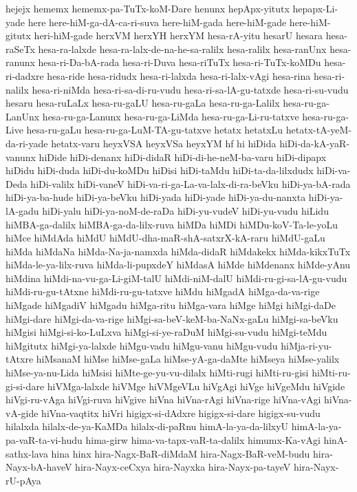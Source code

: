 {hejejx
hememx
hememx-pa-TuTx-koM-Dare
henunx
hepApx-yitutx
hepapx-Li-yade
here
here-hiM-ga-dA-ca-ri-suva
here-hiM-gada
here-hiM-gade
here-hiM-gitutx
heri-hiM-gade
herxVM
herxYH
herxYM
hesa-rA-yitu
hesarU
hesara
hesa-raSeTx
hesa-ra-lalxde
hesa-ra-lalx-de-na-he-sa-ralilx
hesa-ralilx
hesa-ranUnx
hesa-ranunx
hesa-ri-Da-bA-rada
hesa-ri-Duva
hesa-riTuTx
hesa-ri-TuTx-koMDu
hesa-ri-dadxre
hesa-ride
hesa-ridudx
hesa-ri-lalxda
hesa-ri-lalx-vAgi
hesa-rina
hesa-ri-nalilx
hesa-ri-niMda
hesa-ri-sa-di-ru-vudu
hesa-ri-sa-lA-gu-tatxde
hesa-ri-su-vudu
hesaru
hesa-ruLaLx
hesa-ru-gaLU
hesa-ru-gaLa
hesa-ru-ga-Lalilx
hesa-ru-ga-LanUnx
hesa-ru-ga-Lanunx
hesa-ru-ga-LiMda
hesa-ru-ga-Li-ru-tatxve
hesa-ru-ga-Live
hesa-ru-gaLu
hesa-ru-ga-LuM-TA-gu-tatxve
hetatx
hetatxLu
hetatx-tA-yeM-da-ri-yade
hetatx-varu
heyxVSA
heyxVSa
heyxYM
hf
hi
hiDida
hiDi-da-kA-yaR-vanunx
hiDide
hiDi-denanx
hiDi-didaR
hiDi-di-he-neM-ba-varu
hiDi-dipapx
hiDidu
hiDi-duda
hiDi-du-koMDu
hiDisi
hiDi-taMdu
hiDi-ta-da-lilxdudx
hiDi-va-Deda
hiDi-valilx
hiDi-vaneV
hiDi-va-ri-ga-La-va-lalx-di-ra-beVku
hiDi-ya-bA-rada
hiDi-ya-ba-hude
hiDi-ya-beVku
hiDi-yada
hiDi-yade
hiDi-ya-du-nanxta
hiDi-ya-lA-gadu
hiDi-yalu
hiDi-ya-noM-de-raDa
hiDi-yu-vudeV
hiDi-yu-vudu
hiLidu
hiMBA-ga-dalilx
hiMBA-ga-da-lilx-ruva
hiMDa
hiMDi
hiMDu-koV-Ta-le-yoLu
hiMce
hiMdAda
hiMdU
hiMdU-dha-maR-shA-satxrX-kA-raru
hiMdU-gaLu
hiMda
hiMdaNa
hiMda-Na-ja-namxda
hiMda-didaR
hiMdakekx
hiMda-kikxTuTx
hiMda-le-ya-lilx-ruva
hiMda-li-pupxdeY
hiMdasA
hiMde
hiMdenanx
hiMde-yAnu
hiMdina
hiMdi-na-vu-ga-Li-giM-talU
hiMdi-niM-dalU
hiMdi-ru-gi-sa-lA-gu-vudu
hiMdi-ru-gu-tAtxne
hiMdi-ru-gu-tatxve
hiMdu
hiMgadA
hiMga-da-va-rige
hiMgade
hiMgadiV
hiMgadu
hiMga-ritu
hiMga-vara
hiMge
hiMgi
hiMgi-daDe
hiMgi-dare
hiMgi-da-va-rige
hiMgi-sa-beV-keM-ba-NaNx-gaLu
hiMgi-sa-beVku
hiMgisi
hiMgi-si-ko-LuLxva
hiMgi-si-ye-raDuM
hiMgi-su-vudu
hiMgi-teMdu
hiMgitutx
hiMgi-ya-lalxde
hiMgu-vadu
hiMgu-vanu
hiMgu-vudu
hiMja-ri-yu-tAtxre
hiMsanaM
hiMse
hiMse-gaLa
hiMse-yA-ga-daMte
hiMseya
hiMse-yalilx
hiMse-ya-nu-Lida
hiMsisi
hiMte-ge-yu-vu-dilalx
hiMti-rugi
hiMti-ru-gisi
hiMti-ru-gi-si-dare
hiVMga-lalxde
hiVMge
hiVMgeVLu
hiVgAgi
hiVge
hiVgeMdu
hiVgide
hiVgi-ru-vAga
hiVgi-ruva
hiVgive
hiVna
hiVna-rAgi
hiVna-rige
hiVna-vAgi
hiVna-vA-gide
hiVna-vaqtitx
hiVri
higigx-si-dAdxre
higigx-si-dare
higigx-su-vudu
hilalxda
hilalx-de-ya-KaMDa
hilalx-di-paRnu
himA-la-ya-da-lilxyU
himA-la-ya-pa-vaR-ta-vi-hudu
hima-girw
hima-va-tapx-vaR-ta-dalilx
himumx-Ka-vAgi
hinA-sathx-lava
hina
hinx
hira-Nagx-BaR-diMdaM
hira-Nagx-BaR-veM-budu
hira-Nayx-bA-haveV
hira-Nayx-ceCxya
hira-Nayxka
hira-Nayx-pa-tayeV
hira-Nayx-rU-pAya
}
